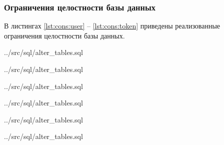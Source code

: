 \newpage

\subsubsection{Ограничения целостности базы данных}

В листингах \ref{lst:cons:user} -- \ref{lst:cons:token} приведены реализованные ограничения целостности базы данных.

\begin{code}
    \begin{lstinputlisting}[
            label={lst:cons:user},
            caption={Ограничения User},
            firstline=1,
            lastline=13,
        ]{../src/sql/alter_tables.sql}
    \end{lstinputlisting}
\end{code}

\begin{code}
    \begin{lstinputlisting}[
            caption={Ограничения Document},
            firstline=15,
            lastline=29,
        ]{../src/sql/alter_tables.sql}
    \end{lstinputlisting}
\end{code}

\begin{code}
    \begin{lstinputlisting}[
            caption={Ограничения DocumentAuthor},
            firstline=37,
            lastline=46,
        ]{../src/sql/alter_tables.sql}
    \end{lstinputlisting}
\end{code}

\begin{code}
    \begin{lstinputlisting}[
            caption={Ограничения Author},
            firstline=31,
            lastline=35,
        ]{../src/sql/alter_tables.sql}
    \end{lstinputlisting}
\end{code}

\begin{code}
    \begin{lstinputlisting}[
            caption={Ограничения AnnotationTask},
            firstline=48,
            lastline=64,
        ]{../src/sql/alter_tables.sql}
    \end{lstinputlisting}
\end{code}

\begin{code}
    \begin{lstinputlisting}[
            caption={Ограничения StructAnnotation},
            firstline=66,
            lastline=83,
        ]{../src/sql/alter_tables.sql}
    \end{lstinputlisting}
\end{code}

